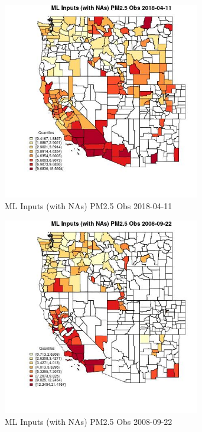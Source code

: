 \begin{figure} 
\centering  
\includegraphics[width=0.77\textwidth]{Code_Outputs/Report_ML_input_PM25_Step4_part_e_de_duplicated_aves_compiled_2019-05-18wNAs_CountyPM25_ObsMean2018-04-11_2018-04-11.jpg} 
\caption{\label{fig:Report_ML_input_PM25_Step4_part_e_de_duplicated_aves_compiled_2019-05-18wNAsCountyPM25_ObsMean2018-04-11_2018-04-11}ML Inputs (with NAs) PM2.5 Obs 2018-04-11} 
\end{figure} 
 

\begin{figure} 
\centering  
\includegraphics[width=0.77\textwidth]{Code_Outputs/Report_ML_input_PM25_Step4_part_e_de_duplicated_aves_compiled_2019-05-18wNAs_CountyPM25_ObsMean2008-09-22_2008-09-22.jpg} 
\caption{\label{fig:Report_ML_input_PM25_Step4_part_e_de_duplicated_aves_compiled_2019-05-18wNAsCountyPM25_ObsMean2008-09-22_2008-09-22}ML Inputs (with NAs) PM2.5 Obs 2008-09-22} 
\end{figure} 
 

